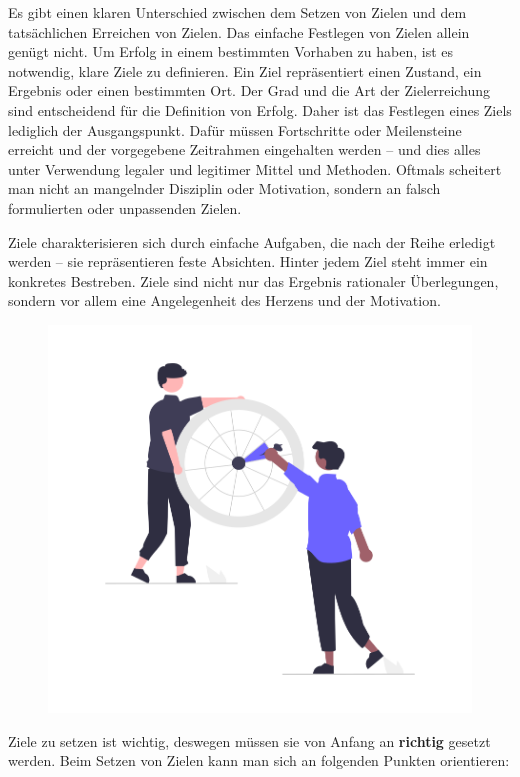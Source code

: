 
Es gibt einen klaren Unterschied zwischen dem Setzen von Zielen und dem tatsächlichen Erreichen von Zielen.
Das einfache Festlegen von Zielen allein genügt nicht. Um Erfolg in einem bestimmten Vorhaben zu haben,
ist es notwendig, klare Ziele zu definieren. Ein Ziel repräsentiert einen Zustand, ein Ergebnis oder einen
bestimmten Ort. Der Grad und die Art der Zielerreichung sind entscheidend für die Definition von Erfolg. Daher
ist das Festlegen eines Ziels lediglich der Ausgangspunkt. Dafür müssen Fortschritte oder Meilensteine
erreicht und der vorgegebene Zeitrahmen eingehalten werden – und dies alles unter Verwendung legaler und
legitimer Mittel und Methoden. Oftmals scheitert man nicht an mangelnder Disziplin oder Motivation, sondern
an falsch formulierten oder unpassenden Zielen.

Ziele charakterisieren sich durch einfache Aufgaben, die nach der Reihe erledigt werden – sie repräsentieren
feste Absichten. Hinter jedem Ziel steht immer ein konkretes Bestreben.
Ziele sind nicht nur das Ergebnis rationaler Überlegungen, sondern vor allem eine Angelegenheit des Herzens
und der Motivation.\cite{ziele}

\begin{figure}[H]
    \centering
    \includegraphics[height=0.45\textwidth]{./pics/undraw_Target_re_fi8j.png}
    \caption{}
\end{figure}

Ziele zu setzen ist wichtig, deswegen müssen sie von Anfang an \textbf{richtig} gesetzt werden. Beim Setzen von Zielen
kann man sich an folgenden Punkten orientieren: \cite{ziele}

